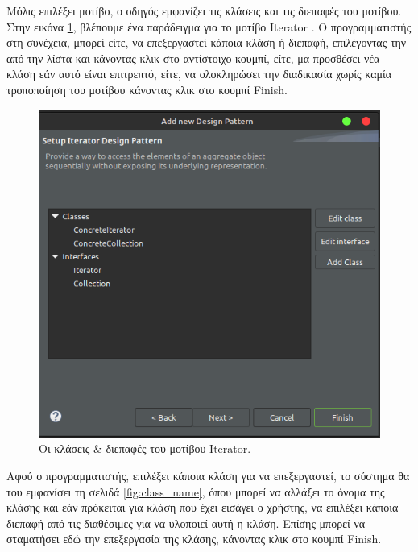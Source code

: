 Μόλις επιλέξει μοτίβο, ο οδηγός εμφανίζει τις κλάσεις και τις διεπαφές του μοτίβου. Στην εικόνα \ref{fig:classes_interfaces}, 
βλέπουμε ένα παράδειγμα για το μοτίβο Iterator \cite{GoF}. Ο προγραμματιστής στη συνέχεια, 
μπορεί είτε, να επεξεργαστεί κάποια κλάση ή διεπαφή, επιλέγοντας την από την λίστα και κάνοντας κλικ στο αντίστοιχο κουμπί, 
είτε, μα προσθέσει νέα κλάση εάν αυτό είναι επιτρεπτό, είτε, να ολοκληρώσει την διαδικασία χωρίς καμία τροποποίηση 
του μοτίβου κάνοντας κλικ στο κουμπί Finish.
\begin{figure}[H]
    \centering
    \includegraphics[width=1.0\textwidth]{Figures/classes_interfaces.png}
    \caption{Οι κλάσεις \& διεπαφές του μοτίβου Iterator.}
    \label{fig:classes_interfaces}
\end{figure}
Αφού ο προγραμματιστής, επιλέξει κάποια κλάση για να επεξεργαστεί, το σύστημα θα του εμφανίσει τη σελιδά \ref{fig:class_name}, 
όπου μπορεί να αλλάξει το όνομα της κλάσης και εάν πρόκειται για κλάση που έχει εισάγει ο χρήστης, 
να επιλέξει κάποια διεπαφή από τις διαθέσιμες για να υλοποιεί αυτή η κλάση. Επίσης μπορεί να σταματήσει εδώ την επεξεργασία της κλάσης, 
κάνοντας κλικ στο κουμπί Finish.
